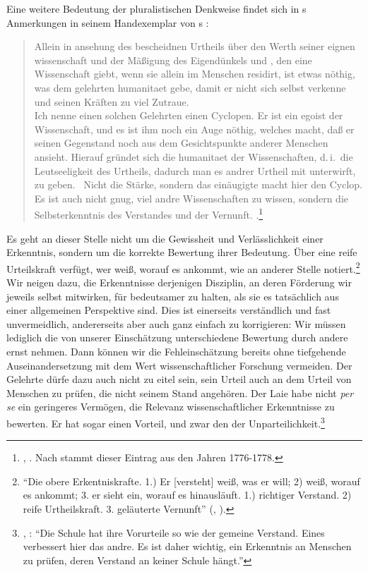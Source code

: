 Eine weitere Bedeutung der pluralistischen Denkweise findet sich in
s Anmerkungen in seinem Handexemplar von
s :
\begin{quote}
 Allein in ansehung des bescheidnen Urtheils über den Werth seiner eignen
 wissenschaft und der Mäßigung des Eigendünkels und , den eine
 Wissenschaft giebt, wenn sie allein im Menschen residirt, ist etwas nöthig, was
 dem gelehrten humanitaet gebe, damit er nicht sich selbst verkenne und seinen
 Kräften zu viel Zutraue.\\ Ich nenne einen solchen Gelehrten einen Cyclopen. Er
 ist ein egoist der Wissenschaft, und es ist ihm noch ein Auge nöthig, welches
 macht, daß er seinen Gegenstand noch aus dem Gesichtspunkte anderer Menschen
 ansieht. Hierauf gründet sich die humanitaet der Wissenschaften, d.\,i.\ die
 Leutseeligkeit des Urtheils, dadurch man es andrer Urtheil mit unterwirft, zu
 geben. \punkt\ Nicht die Stärke, sondern das einäugigte macht hier den Cyclop.
 Es ist auch nicht gnug, viel andre Wissenschaften zu wissen, sondern die
 Selbsterkenntnis des Verstandes und der Vernunft. .\footnote{\cite[][]{Kant:Reflexionen1900ff.},
 \cite[][XV: 394.23--395.8,395.29--32]{Kant:GesammelteWerke1900ff.}. Nach
  stammt dieser Eintrag aus den Jahren 1776-1778.}
\end{quote}
Es geht an dieser Stelle nicht um die Gewissheit und Verlässlichkeit einer
Erkenntnis, sondern um die korrekte Bewertung ihrer Bedeutung. Über eine reife
Urteilskraft verfügt, wer weiß, worauf es ankommt, wie  an
anderer Stelle notiert.\footnote{\enquote{Die obere Erkentniskrafte. 1.) Er
[versteht] weiß, was er will; 2) weiß, worauf es ankommt; 3. er sieht ein,
worauf es hinausläuft. 1.) richtiger Verstand. 2) reife Urtheilskraft. 3.
geläuterte Vernunft} \mkbibparens{\cite[][]{Kant:Reflexionen1900ff.},
\cite[][XV: 188.6--8]{Kant:GesammelteWerke1900ff.}}.}
Wir neigen dazu, die Erkenntnisse derjenigen Disziplin, an deren Förderung wir
jeweils selbst mitwirken, für bedeutsamer zu halten, als sie es tatsächlich aus
einer allgemeinen Perspektive sind. Dies ist einerseits verständlich und fast
unvermeidlich, andererseits aber auch ganz einfach zu korrigieren: Wir müssen
lediglich die von unserer Einschätzung unterschiedene Bewertung durch andere
ernst nehmen. Dann können wir die Fehleinschätzung bereits ohne tiefgehende
Auseinandersetzung mit dem Wert wissenschaftlicher Forschung vermeiden. Der
Gelehrte dürfe dazu auch nicht zu eitel sein, sein Urteil auch an dem Urteil von
Menschen zu prüfen, die nicht seinem Stand angehören. Der Laie habe nicht
\emph{per se} ein geringeres Vermögen, die Relevanz wissenschaftlicher
Erkenntnisse zu bewerten. Er hat sogar einen Vorteil, und zwar den der
Unparteilichkeit.\footnote{\cite[Vgl.][A 66]{Kant:ImmanuelKantsLogik1977},
\cite[][IX: 48.13--16]{Kant:GesammelteWerke1900ff.}: \enquote{Die Schule hat
ihre Vorurteile so wie der gemeine Verstand. Eines verbessert hier das andre. Es ist daher
wichtig, ein Erkenntnis an Menschen zu prüfen, deren Verstand an keiner Schule
hängt.}}

